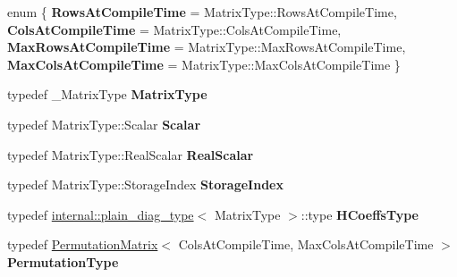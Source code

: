 \begin{DoxyCompactItemize}
\item 
\mbox{\label{class_eigen_1_1_col_piv_householder_q_r_aefe2f8b963967e6ca91a23284d1f5da1}} 
enum \{ {\bfseries Rows\+At\+Compile\+Time} = Matrix\+Type\+::Rows\+At\+Compile\+Time, 
{\bfseries Cols\+At\+Compile\+Time} = Matrix\+Type\+::Cols\+At\+Compile\+Time, 
{\bfseries Max\+Rows\+At\+Compile\+Time} = Matrix\+Type\+::Max\+Rows\+At\+Compile\+Time, 
{\bfseries Max\+Cols\+At\+Compile\+Time} = Matrix\+Type\+::Max\+Cols\+At\+Compile\+Time
 \}
\item 
\mbox{\label{class_eigen_1_1_col_piv_householder_q_r_a8276f0f98a2d82532146ae8b5967f6e9}} 
typedef \+\_\+\+Matrix\+Type {\bfseries Matrix\+Type}
\item 
\mbox{\label{class_eigen_1_1_col_piv_householder_q_r_a7a1da52a50e75161a8ea7b3f72934129}} 
typedef Matrix\+Type\+::\+Scalar {\bfseries Scalar}
\item 
\mbox{\label{class_eigen_1_1_col_piv_householder_q_r_a55487671adbf44783c3c8b109cb0a14d}} 
typedef Matrix\+Type\+::\+Real\+Scalar {\bfseries Real\+Scalar}
\item 
\mbox{\label{class_eigen_1_1_col_piv_householder_q_r_aa5d396f5f75b59073a6ed5c0f54bfd42}} 
typedef Matrix\+Type\+::\+Storage\+Index {\bfseries Storage\+Index}
\item 
\mbox{\label{class_eigen_1_1_col_piv_householder_q_r_a5773b249a76bed6f46e04b9a2c832019}} 
typedef \mbox{\hyperlink{struct_eigen_1_1internal_1_1plain__diag__type}{internal\+::plain\+\_\+diag\+\_\+type}}$<$ Matrix\+Type $>$\+::type {\bfseries H\+Coeffs\+Type}
\item 
\mbox{\label{class_eigen_1_1_col_piv_householder_q_r_a04a1ec15296f9c62857e98e7699fe2a9}} 
typedef \mbox{\hyperlink{class_eigen_1_1_permutation_matrix}{Permutation\+Matrix}}$<$ Cols\+At\+Compile\+Time, Max\+Cols\+At\+Compile\+Time $>$ {\bfseries Permutation\+Type}
\item 

\end{DoxyCompactItemize}
